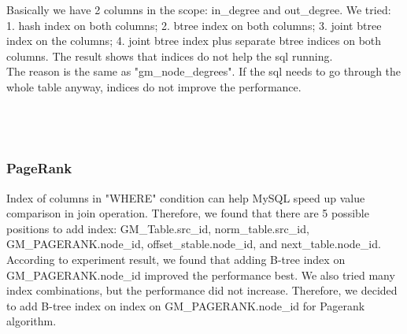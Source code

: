 Basically we have 2 columns in the scope: in\_degree and out\_degree. We tried: 1. hash index on both columns; 2. btree index on both columns; 3. joint btree index on the columns; 4. joint btree index plus separate btree indices on both columns. The result shows that indices do not help the sql running.\\
The reason is the same as "gm\_node\_degrees". If the sql needs to go through the whole table anyway, indices do not improve the performance.\\
\\
\\
 \\


\subsubsection{PageRank}

Index of columns in "WHERE" condition can help MySQL speed up value comparison in join operation. Therefore, we found that there are 5 possible positions to add index: GM\_Table.src\_id, norm\_table.src\_id, GM\_PAGERANK.node\_id, offset\_stable.node\_id, and next\_table.node\_id. 
\\
According to experiment result, we found that adding B-tree index on GM\_PAGERANK.node\_id improved the performance best. We also tried many index combinations, but the performance did not increase. Therefore, we decided to add B-tree index on index on GM\_PAGERANK.node\_id  for Pagerank algorithm.

